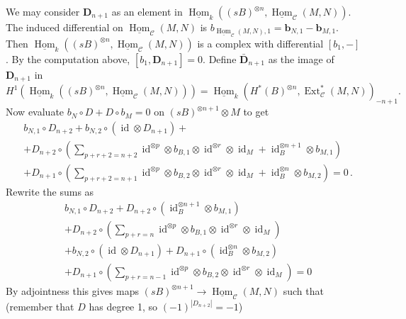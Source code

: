 \documentclass{amsart}
\numberwithin{equation}{section}
\let\cal\mathcal
\theoremstyle{definition}
\theoremstyle{remark}
\begin{document}
We may consider $\textbf{D}_{n+1}$ as an element in
$\underline{\operatorname {Hom}}_k((sB)^{\otimes n},\underline{\operatorname {Hom}}_{{\cal C}}(M,N))$. The induced differential on $\underline{\operatorname {Hom}}_{{\cal C}}(M,N)$ is
$b_{{\underline{\operatorname {Hom}}_{{\cal C}}}(M,N),1}=\textbf{b}_{N,1}-\textbf{b}_{M,1}$. Then
$\underline{\operatorname {Hom}}_k((sB)^{\otimes n},\underline{\operatorname {Hom}}_{{\cal C}}(M,N))$ is a complex with differential
$[b_1,-]$. By the computation above,
$[b_1,\textbf{D}_{n+1}]=0$. Define $\bar{\textbf{D}}_{n+1}$ as the
image of $\textbf{D}_{n+1}$ in
\[
H^1(\underline{\operatorname {Hom}}_k((sB)^{\otimes n},\underline{\operatorname {Hom}}_{{\cal C}}(M,N)))=\underline{\operatorname {Hom}}_k(H^*(B)^{\otimes n},{\operatorname {Ext}}^*_{{\cal C}}(M,N))_{-n+1}.
\]
Now evaluate $b_N\circ D+ D\circ b_M=0$ on $(sB)^{\otimes n+1}\otimes M$ to get
\begin{align*}
&b_{N,1}\circ D_{n+2} +b_{N,2}\circ({{\operatorname {id}}}\otimes D_{n+1}) + \\
&+D_{n+2}\circ \left( \sum_{p+r+2=n+2} {{\operatorname {id}}}^{\otimes p}\otimes b_{B,1}\otimes {{\operatorname {id}}}^{\otimes r}\otimes {{\operatorname {id}}}_M + {{\operatorname {id}}}_B^{\otimes n+1}\otimes b_{M,1}\right) \\
&+D_{n+1}\circ \left( \sum_{p+r+2=n+1} {{\operatorname {id}}}^{\otimes p}\otimes b_{B,2}\otimes {{\operatorname {id}}}^{\otimes r}\otimes {{\operatorname {id}}}_M + {{\operatorname {id}}}_B^{\otimes n}\otimes b_{M,2}\right)=0\,.
\end{align*}
Rewrite the sums as
\begin{align*}
&b_{N,1}\circ D_{n+2} +D_{n+2}\circ ( {{\operatorname {id}}}_B^{\otimes n+1} \otimes b_{M,1} ) \\
&+D_{n+2}\circ \left( \sum_{p+r=n} {{\operatorname {id}}}^{\otimes p}\otimes b_{B,1}\otimes {{\operatorname {id}}}^{\otimes r}\otimes {{\operatorname {id}}}_M \right) \\
&+b_{N,2}\circ({{\operatorname {id}}}\otimes D_{n+1})+D_{n+1}\circ ({{\operatorname {id}}}_B^{\otimes n}\otimes b_{M,2})  \\
&+D_{n+1}\circ \left( \sum_{p+r=n-1} {{\operatorname {id}}}^{\otimes p}\otimes b_{B,2}\otimes {{\operatorname {id}}}^{\otimes r}\otimes {{\operatorname {id}}}_M \right)=0
\end{align*}
By adjointness this gives maps $(sB)^{\otimes n+1}\to \underline{\operatorname {Hom}}_{{\cal C}}(M,N)$ such that (remember that $D$ has degree 1, so $(-1)^{|D_{n+2}|}=-1$)
\end{document}

